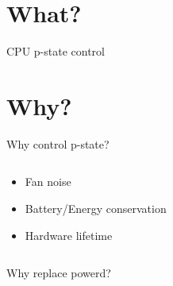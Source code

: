 \documentclass[aspectratio=169]{beamer}
\begin{document}
\section{What?}

\begin{frame}{CPU p-state control}
\centering
{}
\end{frame}

\section{Why?}

\begin{frame}{Why control p-state?}
\begin{columns}[onlytextwidth]
\begin{column}{0.4\textwidth}
\begin{itemize}
\item<1-> Fan noise
\item<2-> Battery/Energy conservation
\item<3-> Hardware lifetime
\end{itemize}
\end{column}
\begin{column}{0.6\textwidth}
\begin{tikzpicture}[scale=.6]


\end{tikzpicture}
\end{column}
\end{columns}
\end{frame}

\begin{frame}{Why replace powerd?}
\centering
{}
\end{frame}
\end{document}
